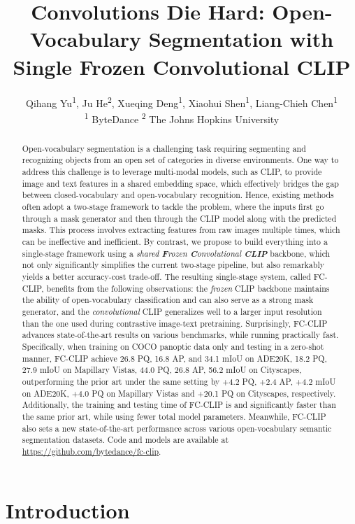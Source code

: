 \documentclass{article}
\title{Convolutions Die Hard: Open-Vocabulary Segmentation with Single Frozen Convolutional CLIP}
\author{Qihang Yu\textsuperscript{1}, Ju He\textsuperscript{2}, Xueqing Deng\textsuperscript{1}, Xiaohui Shen\textsuperscript{1}, Liang-Chieh Chen\textsuperscript{1}\\
  \textsuperscript{1} ByteDance \qquad
   \textsuperscript{2} The Johns Hopkins University
}
\newcommand{\modelname}{FC-CLIP\xspace}
\begin{document}
\maketitle

\begin{abstract}
Open-vocabulary segmentation is a challenging task requiring segmenting and recognizing objects from an open set of categories in diverse environments.
One way to address this challenge is to leverage multi-modal models, such as CLIP, to provide image and text features in a shared embedding space, which effectively bridges the gap between closed-vocabulary and open-vocabulary recognition.
Hence, existing methods often adopt a two-stage framework to tackle the problem, where the inputs first go through a mask generator and then through the CLIP model along with the predicted masks.
This process involves extracting features from raw images multiple times, which can be ineffective and inefficient.
By contrast, we propose to build everything into a single-stage framework using a \textit{shared \textbf{F}rozen \textbf{C}onvolutional \textbf{CLIP}} backbone, which not only significantly simplifies the current two-stage pipeline, but also remarkably yields a better accuracy-cost trade-off.
The resulting single-stage system, called \modelname, benefits from the following observations: the \textit{frozen} CLIP backbone maintains the ability of open-vocabulary classification and can also serve as a strong mask generator, and the \textit{convolutional} CLIP generalizes well to a larger input resolution than the one used during contrastive image-text pretraining.
Surprisingly, \modelname advances state-of-the-art results on various benchmarks, while running practically fast.
Specifically, when training on COCO panoptic data only and testing in a zero-shot manner, \modelname achieve 26.8 PQ, 16.8 AP, and 34.1 mIoU on ADE20K, 18.2 PQ, 27.9 mIoU on Mapillary Vistas, 44.0 PQ, 26.8 AP, 56.2 mIoU on Cityscapes, outperforming the prior art under the same setting by +4.2 PQ, +2.4 AP, +4.2 mIoU on ADE20K, +4.0 PQ on Mapillary Vistas and +20.1 PQ on Cityscapes, respectively.
Additionally, the training and testing time of \modelname is  and  
 significantly faster than the same prior art, while using  fewer total model parameters.
Meanwhile, \modelname also sets a new state-of-the-art performance across various open-vocabulary semantic segmentation datasets.
Code and models are available at \url{https://github.com/bytedance/fc-clip}.
\end{abstract} \section{Introduction}
\label{Introduction}
\end{document}
